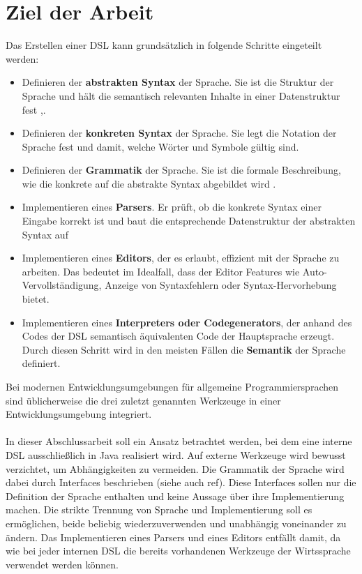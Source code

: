 \section{Ziel der Arbeit}\label{sct:2.3:ziel}
Das Erstellen einer DSL kann grundsätzlich in folgende Schritte eingeteilt werden:
\begin{itemize}
	\item Definieren der \textbf{abstrakten Syntax} der Sprache. Sie ist die Struktur der Sprache und hält die semantisch relevanten Inhalte in einer Datenstruktur fest \cite{www:heise},\cite{vl:drachen:teil3}.
	\item Definieren der \textbf{konkreten Syntax} der Sprache. Sie legt die Notation der Sprache fest und damit, welche Wörter und Symbole gültig sind\cite{vl:drachen:teil3}.
	\item Definieren der \textbf{Grammatik} der Sprache. Sie ist die formale Beschreibung, wie die konkrete auf die abstrakte Syntax abgebildet wird \cite{www:heise}.
	\item Implementieren eines \textbf{Parsers}. Er prüft, ob die konkrete Syntax einer Eingabe korrekt ist und baut die entsprechende Datenstruktur der abstrakten Syntax auf \cite{vl:drachen:teil3} 
	\item Implementieren eines \textbf{Editors}, der es erlaubt, effizient mit der Sprache zu arbeiten. Das bedeutet im Idealfall, dass der Editor Features wie Auto-Vervollständigung, Anzeige von Syntaxfehlern oder Syntax-Hervorhebung bietet.
	\item Implementieren eines \textbf{Interpreters oder Codegenerators}, der anhand des Codes der DSL semantisch äquivalenten Code der Hauptsprache erzeugt. Durch diesen Schritt wird in den meisten Fällen die \textbf{Semantik} der Sprache definiert.
\end{itemize}
Bei modernen Entwicklungsumgebungen für allgemeine Programmiersprachen sind üblicherweise die drei zuletzt genannten Werkzeuge in einer Entwicklungsumgebung integriert.
\\ \\ %
In dieser Abschlussarbeit soll ein Ansatz betrachtet werden, bei dem eine interne DSL ausschließlich in Java realisiert wird. Auf externe Werkzeuge wird bewusst verzichtet, um Abhängigkeiten zu vermeiden. Die Grammatik der Sprache wird dabei durch Interfaces beschrieben (siehe auch ref). Diese Interfaces sollen nur die Definition der Sprache enthalten und keine Aussage über ihre Implementierung machen. Die strikte Trennung von Sprache und Implementierung soll es ermöglichen, beide beliebig wiederzuverwenden und unabhängig voneinander zu ändern.
Das Implementieren eines Parsers und eines Editors entfällt damit, da wie bei jeder internen DSL die bereits vorhandenen Werkzeuge der Wirtssprache verwendet werden können.

